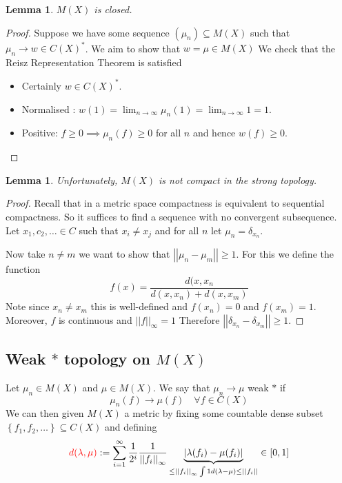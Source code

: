 \documentclass[11pt]{article}
\newcommand{\defeq}{:=}
\newcommand{\abs}[1]{\left|#1\right|}
\newcommand{\norm}[1]{\left|\left|#1\right|\right|}
\newenvironment{defin}
	{\begin{mdframed}[backgroundcolor=white, roundcorner=5pt, linewidth=1pt]}
	{\end{mdframed}}
\newcommand{\mdf}[1]{{\color{red} #1}}
\newtheorem{lemma}[prop]{Lemma}
\begin{document}
\begin{lemma}
$M(X)$ is closed.
\end{lemma}

\begin{proof}
Suppose we have some sequence $(\mu_n)\subseteq M(X)$ such that $\mu_n\to w\in C(X)^\ast$.
We aim to show that $w=\mu\in M(X)$
We check that the Reisz Representation Theorem is satisfied
\begin{itemize}
	\item Certainly $w\in C(X)^\ast$.
	\item Normalised : $w(1)=\lim_{n\to\infty}\mu_n(1) = \lim_{n\to\infty}1=1$.
	\item Positive: $f\geq 0 \implies \mu_n(f)\geq 0$ for all $n$ and hence $w(f)\geq 0$.
\end{itemize}
\end{proof}

\begin{lemma}
Unfortunately, $M(X)$ is not compact in the strong topology.
\end{lemma}
\begin{proof}
Recall that in a metric space compactness is equivalent to sequential compactness.
So it suffices to find a sequence with no convergent subsequence.
Let $x_1, c_2, \dots \in C$ such that $x_i\neq x_j$ and for all $n$ let $\mu_n=\delta_{x_n}$.

Now take $n\neq m$ we want to show that $\norm{\mu_n - \mu_m} \geq 1$.
For this we define the function 
\[
	f(x)=\frac{d(x, x_n}{d(x, x_n) + d(x, x_m)}
\]
Note since $x_n\neq x_m$ this is well-defined and $f(x_n)=0$ and $f(x_m)=1$.
Moreover, $f$ is continuous and $\norm{f}_\infty = 1$
Therefore $\norm{\delta_{x_n}-\delta_{x_m}}\geq 1$.
\end{proof}

\subsection{Weak $\ast$ topology on $M(X)$}
\begin{defin}
	Let $\mu_n\in M(X)$ and $\mu\in M(X)$.
	We say that $\mu_n\to\mu$ \mdf{weak $\ast$} if
	\[
		\mu_n(f)\to\mu(f) \quad \forall f\in C(X)
	\]
	We can then given $M(X)$ a metric by fixing some countable dense subset $\left\{ f_1, f_2, \dots \right\}\subseteq C(X)$ and defining
	\[
		\mdf{d(\lambda, \mu)}\defeq \sum_{i=1}^{\infty}\frac{1}{2^i}\frac{1}{\norm{f_i}_\infty}\underbrace{\abs{\lambda(f_i)-\mu(f_i)}}_{\leq\norm{f_i}_\infty \int 1 d(\lambda - \mu) \leq \norm{f_i}}\in [0, 1]
	\]
\end{defin}
\end{document}
